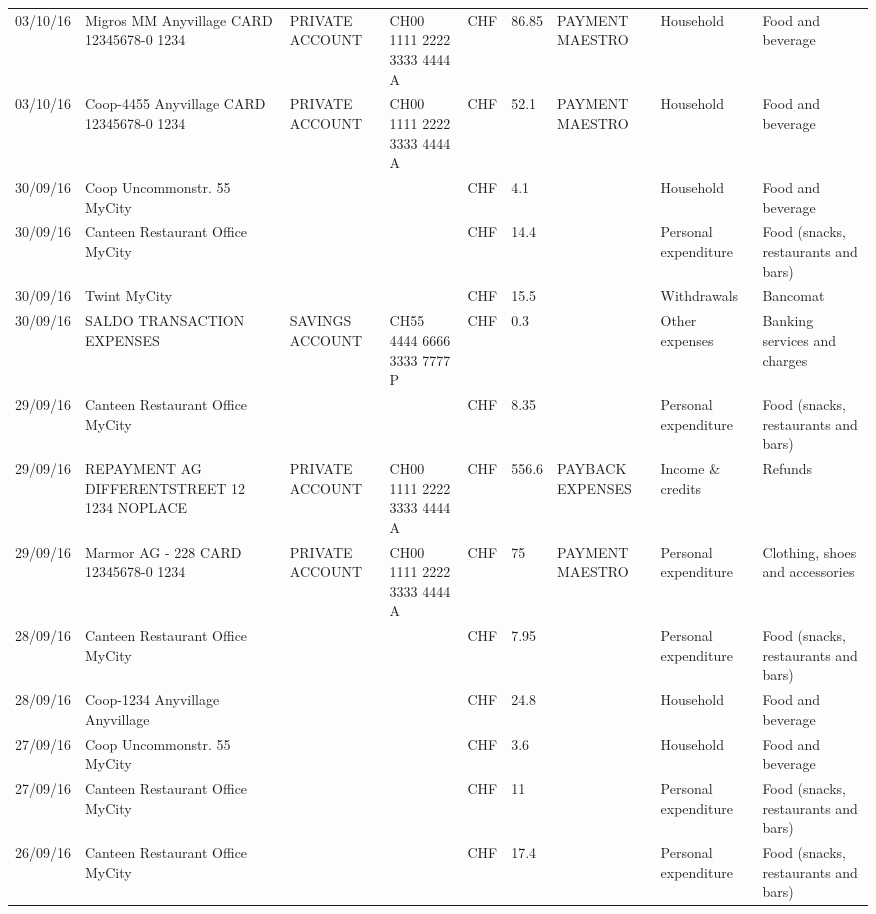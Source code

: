 \begin{landscape}
\begin{adjustwidth}{-2cm}{-2cm}
\begin{tiny}
\begin{longtable}{lp{4cm}llllp{3cm}ll}
		03/10/16 & Migros MM Anyvillage CARD 12345678-0 1234 & PRIVATE ACCOUNT & CH00 1111 2222 3333 4444 A & CHF   & 86.85 & PAYMENT MAESTRO & Household & Food and beverage \\
		03/10/16 & Coop-4455 Anyvillage CARD 12345678-0 1234 & PRIVATE ACCOUNT & CH00 1111 2222 3333 4444 A & CHF   & 52.1  & PAYMENT MAESTRO & Household & Food and beverage \\
		30/09/16 & Coop Uncommonstr. 55   MyCity &       &       & CHF   & 4.1   &       & Household & Food and beverage \\
		30/09/16 & Canteen Restaurant Office      MyCity &       &       & CHF   & 14.4  &       & Personal expenditure & Food (snacks, restaurants and bars) \\
		30/09/16 & Twint               MyCity &       &       & CHF   & 15.5  &       & Withdrawals & Bancomat \\
		30/09/16 & SALDO TRANSACTION EXPENSES & SAVINGS ACCOUNT & CH55 4444 6666 3333 7777 P & CHF   & 0.3   &       & Other expenses & Banking services and charges \\
		29/09/16 & Canteen Restaurant Office      MyCity &       &       & CHF   & 8.35  &       & Personal expenditure & Food (snacks, restaurants and bars) \\
		29/09/16 & REPAYMENT AG DIFFERENTSTREET 12 1234 NOPLACE & PRIVATE ACCOUNT & CH00 1111 2222 3333 4444 A & CHF   & 556.6 & PAYBACK EXPENSES & Income \& credits & Refunds \\
		29/09/16 & Marmor AG - 228 CARD 12345678-0 1234 & PRIVATE ACCOUNT & CH00 1111 2222 3333 4444 A & CHF   & 75    & PAYMENT MAESTRO & Personal expenditure & Clothing, shoes and accessories \\
		28/09/16 & Canteen Restaurant Office      MyCity &       &       & CHF   & 7.95  &       & Personal expenditure & Food (snacks, restaurants and bars) \\
		28/09/16 & Coop-1234 Anyvillage    Anyvillage &       &       & CHF   & 24.8  &       & Household & Food and beverage \\
		27/09/16 & Coop Uncommonstr. 55   MyCity &       &       & CHF   & 3.6   &       & Household & Food and beverage \\
		27/09/16 & Canteen Restaurant Office      MyCity &       &       & CHF   & 11    &       & Personal expenditure & Food (snacks, restaurants and bars) \\
		26/09/16 & Canteen Restaurant Office      MyCity &       &       & CHF   & 17.4  &       & Personal expenditure & Food (snacks, restaurants and bars) \\

\end{longtable}
\end{tiny}
\end{adjustwidth}
\end{landscape}

